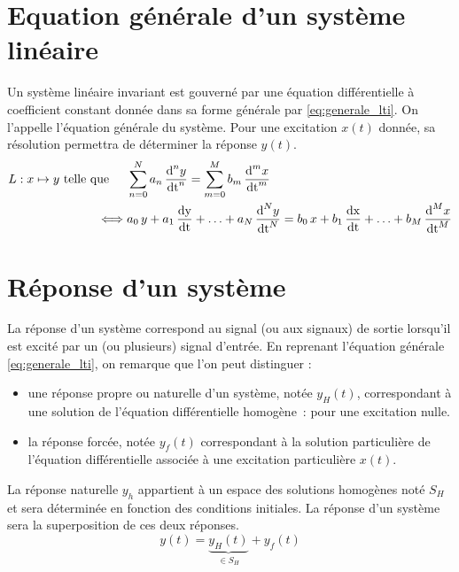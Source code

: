 \begin{remark}{}
	
	
	\section{Equation générale d'un système linéaire}
        Un système linéaire invariant est gouverné par une équation
        différentielle à coefficient constant donnée dans sa forme
        générale par \ref{eq:generale_lti}. On l'appelle l'équation
        générale du système. Pour une excitation $x(t)$ donnée, sa
        résolution permettra de déterminer la réponse $y(t)$.	
	\begin{eqnarray}\label{eq:generale_lti}
          L : x \mapsto y \text{ telle que }\;\;\;\; &\sum_{n=0}^N{a_{n}\,\frac{\mathrm{d{}}^{n}y}{{\mathrm{d{t}}}^{n}}} = \sum_{m=0}^M b_{m}\, \frac{\mathrm{d{}}^{m}x}{{\mathrm{d{t}}}^{m}}\\\nonumber
       \iff & a_0\,y + a_1\,\frac{\mathrm{d{y}}}{\mathrm{d{t}}} +\ldots + a_{N}\,\frac{\mathrm{d{}}^{N}y}{{\mathrm{d{t}}}^{N}} = b_0\,x + b_1\,\frac{\mathrm{d{x}}}{\mathrm{d{t}}} +\ldots + b_{M}\,\frac{\mathrm{d{}}^{M}x}{{\mathrm{d{t}}}^{M}} 
        \end{eqnarray}
	
	
	\section{Réponse d'un système}
	La réponse d'un système correspond au signal (ou aux signaux)
        de sortie lorsqu'il est excité par un (ou plusieurs) signal
        d'entrée. En reprenant l'équation générale
        \ref{eq:generale_lti}, on remarque que l'on peut
        distinguer :
	\begin{itemize}
        \item une réponse propre ou naturelle d'un système, notée
          $y_{H}(t)$, correspondant à une solution de l'équation
          différentielle homogène~: \cad{} pour une excitation nulle.
        \item la réponse forcée, notée $y_{f}(t)$ correspondant à la
          solution particulière de l'équation différentielle associée
          à une excitation particulière $x(t)$.
	\end{itemize}
	
	La réponse naturelle $y_h$ appartient à un espace des
        solutions homogènes noté $S_H$ et sera déterminée en fonction
        des conditions initiales. La réponse d'un système sera la
        superposition de ces deux réponses.
	\begin{equation}
          y(t) = \underbrace{y_{H}(t)}_{\in S_H} + y_{f}(t)          
	\end{equation}
	

\end{remark}
